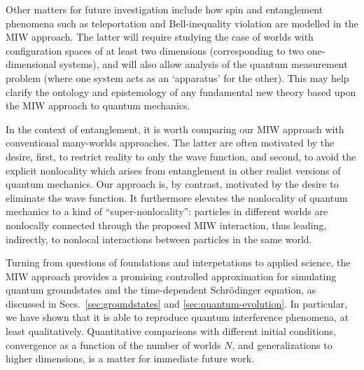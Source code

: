 \documentclass[12pt, aps,pra,amsmath,amssymb,superscriptaddress]{revtex4-2}
\renewcommand{\(}{\left(}
\renewcommand{\)}{\right)}
\newcommand{\blk}{\color{black}}
\newcommand{\blu}{\color{blue}}
\renewcommand\blu{\blk}
\begin{document}
Other matters for future investigation include   how spin and   entanglement
\blu phenomena such as teleportation and Bell-inequality violation \blk are
modelled in the
MIW approach. The latter \blk will require studying the case of worlds with configuration
spaces of at least two dimensions (corresponding to two one-dimensional
systems), and will also allow analysis of the quantum measurement problem (where
one system acts as an `apparatus' for the other). This may help clarify 
the ontology and epistemology of any fundamental new theory based upon
the MIW approach to quantum mechanics. \blk 

In the context of entanglement, it is worth comparing our MIW approach with 
conventional  many-worlds approaches. The latter  are often motivated by the desire,
first,  to restrict reality to only the wave function, and second, to avoid the 
explicit nonlocality which arises from entanglement \blk in other realist versions of quantum mechanics. Our
approach is, by  contrast,   motivated by the desire to 
eliminate the wave function.  It  furthermore
elevates the  nonlocality of quantum mechanics to a kind of
``super-nonlocality'':  particles in different worlds are nonlocally connected through the proposed MIW interaction, thus leading, indirectly, to  nonlocal interactions between particles in the same world. 
\blk

 Turning from questions of foundations and interpetations to applied science, 
the MIW approach  provides  a promising controlled
approximation for simulating \blk quantum groundstates and the time-dependent  Schr\"odinger equation, as
discussed in Secs.~\ref{sec:groundstates} and \ref{sec:quantum-evolution}. 
In particular, we have shown that it is able to reproduce quantum interference phenomena, 
at least qualitatively. Quantitative comparisons with different initial conditions,  convergence as a function of
 the number of worlds  $N$, and generalizations to higher dimensions, is a matter for 
immediate  future work. 
\end{document}

